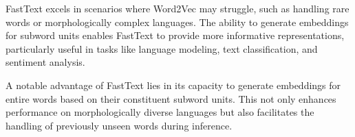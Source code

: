 FastText excels in scenarios where Word2Vec may struggle, such as handling rare words or morphologically complex languages. The ability to generate embeddings for subword units enables FastText to provide more informative representations, particularly useful in tasks like language modeling, text classification, and sentiment analysis.

A notable advantage of FastText lies in its capacity to generate embeddings for entire words based on their constituent subword units. This not only enhances performance on morphologically diverse languages but also facilitates the handling of previously unseen words during inference.



